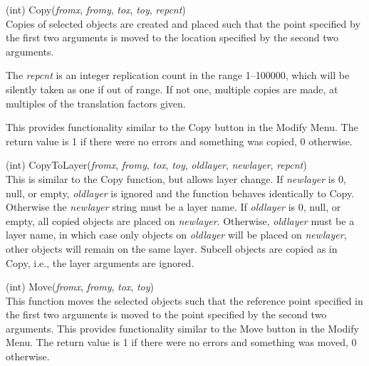 \begin{description}
\item{(int) \vt Copy({\it fromx\/}, {\it fromy\/}, {\it tox\/},
 {\it toy\/}, {\it repcnt\/})}\\
Copies of selected objects are created and placed such that the point
specified by the first two arguments is moved to the location
specified by the second two arguments.

The {\it repcnt} is an integer replication count in the range
1--100000, which will be silently taken as one if out of range.  If
not one, multiple copies are made, at multiples of the translation
factors given.

This provides functionality similar to the {\cb Copy} button in the
{\cb Modify Menu}.  The return value is 1 if there were no errors and
something was copied, 0 otherwise.

\item{(int) \vt CopyToLayer({\it fromx\/}, {\it fromy\/}, {\it tox\/},
 {\it toy\/}, {\it oldlayer\/}, {\it newlayer\/}, {\it repcnt\/})}\\
This is similar to the {\vt Copy} function, but allows layer change. 
If {\it newlayer} is 0, null, or empty, {\it oldlayer} is ignored and
the function behaves identically to {\vt Copy}.  Otherwise the {\it
newlayer} string must be a layer name.  If {\it oldlayer} is 0, null,
or empty, all copied objects are placed on {\it newlayer\/}. 
Otherwise, {\it oldlayer} must be a layer name, in which case only
objects on {\it oldlayer} will be placed on {\it newlayer\/}, other
objects will remain on the same layer.  Subcell objects are copied as
in {\vt Copy}, i.e., the layer arguments are ignored.

\item{(int) \vt Move({\it fromx\/}, {\it fromy\/}, {\it tox\/},
 {\it toy\/})}\\
This function moves the selected objects such that the reference point
specified in the first two arguments is moved to the point specified
by the second two arguments.  This provides functionality similar to
the {\cb Move} button in the {\cb Modify Menu}.  The return value is 1
if there were no errors and something was moved, 0 otherwise.


\end{description}

